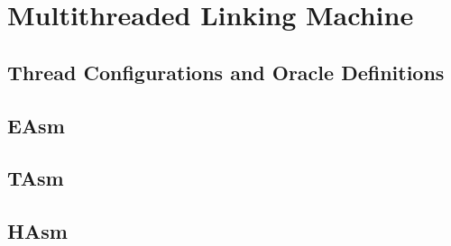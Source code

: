 \section{Multithreaded Linking Machine}
\label{sec:multithreaded-linking-machine}

\subsection{Thread Configurations and Oracle Definitions}
\label{subsec:thread-configuration}


\subsection{EAsm}
\label{subsec:easm}


\subsection{TAsm}
\label{subsec:tasm}


\subsection{HAsm}
\label{subsec:hasm}


